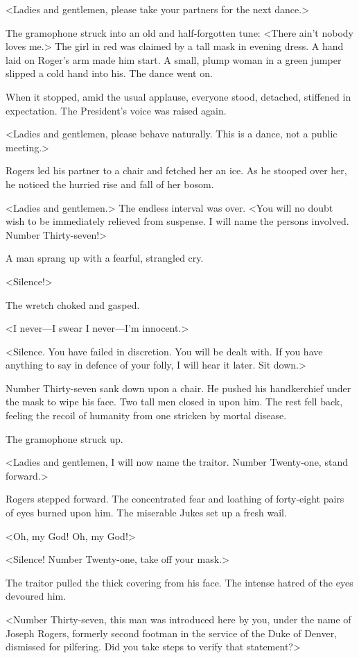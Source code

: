 <Ladies and gentlemen, please take your partners for the next dance.>

The gramophone struck into an old and half-forgotten tune: <There ain't nobody loves me.> The girl in red was claimed by a tall mask in evening dress. A hand laid on Roger's arm made him start. A small, plump woman in a green jumper slipped a cold hand into his. The dance went on.

When it stopped, amid the usual applause, everyone stood, detached, stiffened in expectation. The President's voice was raised again.

<Ladies and gentlemen, please behave naturally. This is a dance, not a public meeting.>

Rogers led his partner to a chair and fetched her an ice. As he stooped over her, he noticed the hurried rise and fall of her bosom.

<Ladies and gentlemen.> The endless interval was over. <You will no doubt wish to be immediately relieved from suspense. I will name the persons involved. Number Thirty-seven!>

A man sprang up with a fearful, strangled cry.

<Silence!>

The wretch choked and gasped.

<I never—I swear I never—I'm innocent.>

<Silence. You have failed in discretion. You will be dealt with. If you have anything to say in defence of your folly, I will hear it later. Sit down.>

Number Thirty-seven sank down upon a chair. He pushed his handkerchief under the mask to wipe his face. Two tall men closed in upon him. The rest fell back, feeling the recoil of humanity from one stricken by mortal disease.

The gramophone struck up.

<Ladies and gentlemen, I will now name the traitor. Number Twenty-one, stand forward.>

Rogers stepped forward. The concentrated fear and loathing of forty-eight pairs of eyes burned upon him. The miserable Jukes set up a fresh wail.

<Oh, my God! Oh, my God!>

<Silence! Number Twenty-one, take off your mask.>

The traitor pulled the thick covering from his face. The intense hatred of the eyes devoured him.

<Number Thirty-seven, this man was introduced here by you, under the name of Joseph Rogers, formerly second footman in the service of the Duke of Denver, dismissed for pilfering. Did you take steps to verify that statement?>

